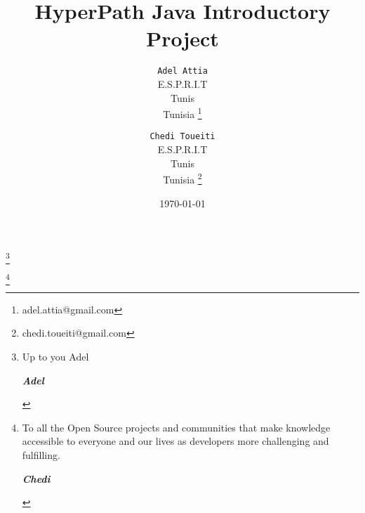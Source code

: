 \title{HyperPath Java Introductory Project}
\author{
  \texttt{Adel Attia}\\
  E.S.P.R.I.T\\
  Tunis\\
  Tunisia  
  \thanks {adel.attia@gmail.com}
  \and
 \texttt{Chedi Toueiti}\\
  E.S.P.R.I.T \\
  Tunis\\
  Tunisia  
  \thanks {chedi.toueiti@gmail.com}
}
\date{\today}
\maketitle
\thanks{
Up to you Adel
\begin{flushright}
\textit{\textbf{Adel}}
\end{flushright}
}

\thanks{
To all the Open Source projects and communities that make knowledge accessible to everyone and our lives as developers more challenging and fulfilling.
\begin{flushright}
\textit{\textbf{Chedi}}
\end{flushright}
}



